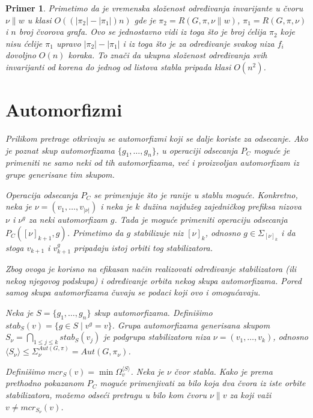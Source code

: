 \documentclass[12pt,oneside]{memoir}
\newtheorem{example}{Primer}
\theoremstyle{definition}
\begin{document}
\begin{example}
  Primetimo da je vremenska složenost određivanja invarijante u čvoru $\nu \|
  w$ u klasi $O((|\pi_2| - |\pi_1|)n)$ gde je $\pi_2 = R(G, \pi, \nu \| w)$,
  $\pi_1 = R(G, \pi, \nu)$ i $n$ broj čvorova grafa. Ovo se jednostavno vidi iz
  toga što je broj ćelija $\pi_2$ koje nisu ćelije $\pi_1$ upravo $|\pi_2| -
  |\pi_1|$ i iz toga što je za određivanje svakog niza $f_i$ dovoljno $O(n)$
  koraka. To znači da ukupna složenost određivanja svih invarijanti od korena
  do jednog od listova stabla pripada klasi $O(n^2)$.

  \pagebreak

 \section{Automorfizmi}

  Prilikom pretrage otkrivaju se automorfizmi koji se dalje koriste za
  odsecanje. Ako je poznat skup automorfizama $\{g_1, \dots, g_n\}$, u
  operaciji odsecanja $P_C$ moguće je primeniti ne samo neki od tih
  automorfizama, već i proizvoljan automorfizam iz grupe generisane tim skupom.
  
  Operacija odsecanja $P_C$ se primenjuje što je ranije u stablu moguće.
  Konkretno, neka je $\nu = (v_1, \dots, v_{|\nu|})$ i neka je $k$ dužina
  najdužeg zajedničkog prefiksa nizova $\nu$ i $\nu^g$ za neki automorfizam
  $g$. Tada je moguće primeniti operaciju odsecanja $P_C([\nu]_{k+1}, g)$.
  Primetimo da $g$ stabilizuje niz $[\nu]_k$, odnosno $g \in \Sigma_{[\nu]_k}$
  i da stoga $v_{k+1}$ i $v_{k+1}^g$ pripadaju istoj orbiti tog stabilizatora.

  Zbog ovoga je korisno na efikasan način realizovati određivanje stabilizatora
  (ili nekog njegovog podskupa) i određivanje orbita nekog skupa automorfizama.
  Pored samog skupa automorfizama čuvaju se podaci koji ovo i omogućavaju.

  Neka je $S = \{g_1, \dots, g_n\}$ skup automorfizama. Definišimo $stab_S(v) =
  \{g \in S \mid v^{g} = v\}$. Grupa automorfizama generisana skupom $S_\nu =
  \bigcap_{1 \leq j \leq k} stab_S(v_j)$ je podgrupa stabilizatora niza $\nu =
  (v_1, \dots, v_k)$, odnosno $\langle S_\nu \rangle \leq \Sigma^{Aut(G,
  \pi)}_\nu = Aut(G, \pi_\nu)$.

  Definišimo $mcr_S(v) = \min \Omega_v^{\langle S \rangle}$. Neka je $\nu$ čvor stabla.
  Kako je prema prethodno pokazanom $P_C$ moguće primenjivati za bilo koja dva
  čvora iz iste orbite stabilizatora, možemo odseći pretragu u bilo kom čvoru
  $\nu \| v$ za koji važi $v \neq mcr_{S_\nu}(v)$.


\end{example}
\end{document}
